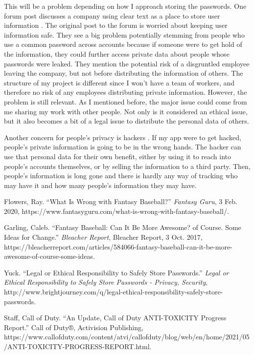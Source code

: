 \documentclass[12pt, twocolumn]{article}
\begin{document}
This will be a problem depending on how I approach storing the passwords. One forum post discusses a company using clear text as a place to store user information \cite{Yuck}. The original post to the forum is worried about keeping user information safe. They see a big problem potentially stemming from people who use a common password across accounts because if someone were to get hold of the information, they could further access private data about people whose passwords were leaked. They mention the potential risk of a disgruntled employee leaving the company, but not before distributing the information of others. The structure of my project is different since I won't have a team of workers, and therefore no risk of any employees distributing private information. However, the problem is still relevant. As I mentioned before, the major issue could come from me sharing my work with other people. Not only is it considered an ethical issue, but it also becomes a bit of a legal issue to distribute the personal data of others. 

Another concern for people's privacy is hackers \cite{Yuck}. If my app were to get hacked, people's private information is going to be in the wrong hands. The hacker can use that personal data for their own benefit, either by using it to reach into people's accounts themselves, or by selling the information to a third party. Then, people's information is long gone and there is hardly any way of tracking who may have it and how many people's information they may have.

\begin{thebibliography}{4}

 Flowers, Ray. “What Is Wrong with Fantasy Baseball?” \emph{Fantasy Guru}, 3 Feb. 2020, https://www.fantasyguru.com/what-is-wrong-with-fantasy-baseball/. 

 Garling, Caleb. “Fantasy Baseball: Can It Be More Awesome? of Course. Some Ideas for Change.” \emph{Bleacher Report}, Bleacher Report, 3 Oct. 2017, https://bleacherreport.com/articles/584066-fantasy-baseball-can-it-be-more-awesome-of-course-some-ideas. 

 Yuck. “Legal or Ethical Responsibility to Safely Store Passwords.” \emph{Legal or Ethical Responsibility to Safely Store Passwords - Privacy, Security}, http://www.brightjourney.com/q/legal-ethical-responsibility-safely-store-passwords. 

 Staff, Call of Duty. “An Update, Call of Duty ANTI-TOXICITY Progress Report.” Call of Duty®, Activision Publishing, https://www.callofduty.com/content/atvi/callofduty/blog/web/en/home/2021/05/ANTI-TOXICITY-PROGRESS-REPORT.html. 

\end{thebibliography}
\end{document}

